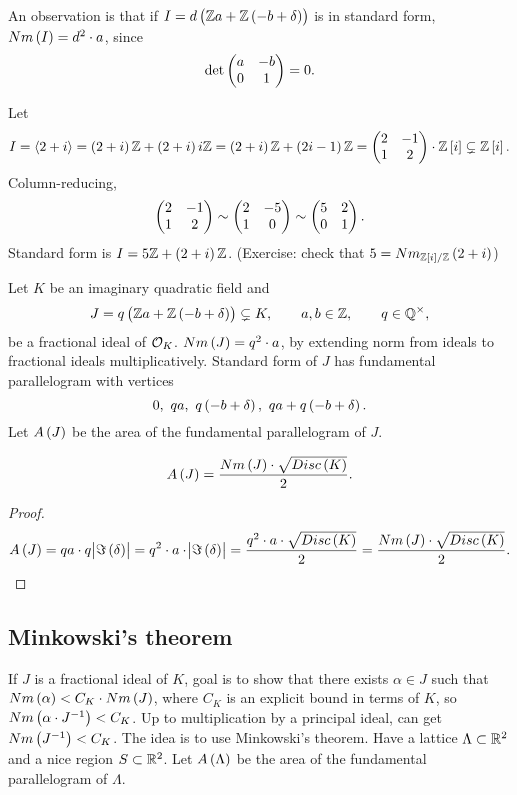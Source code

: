 An observation is that if $ I = d\br{\Z a + \Z\br{-b + \delta}} $ is in standard form, $ Nm\br{I} = d^2 \cdot a $, since
$$ \det\begin{pmatrix} a & -b \\ 0 & 1 \end{pmatrix} = 0. $$

\pagebreak


\begin{example*}
Let
$$ I = \abr{2 + i} = \br{2 + i}\Z + \br{2 + i}i\Z = \br{2 + i}\Z + \br{2i - 1}\Z = \twobytwo{2}{-1}{1}{2} \cdot \Z\sbr{i} \subsetneq \Z\sbr{i}. $$
Column-reducing,
$$ \begin{pmatrix} 2 & -1 \\ 1 & 2 \end{pmatrix} \sim \begin{pmatrix} 2 & -5 \\ 1 & 0 \end{pmatrix} \sim \begin{pmatrix} 5 & 2 \\ 0 & 1 \end{pmatrix}. $$
Standard form is $ I = 5\Z + \br{2 + i}\Z $. (Exercise: check that $ 5 = Nm_{\Z\sbr{i} / \Z}\br{2 + i} $)
\end{example*}

Let $ K $ be an imaginary quadratic field and
$$ J = q\br{\Z a + \Z\br{-b + \delta}} \subsetneq K, \qquad a, b \in \Z, \qquad q \in \Q^\times, $$
be a fractional ideal of $ \mathcal{O}_K $. $ Nm\br{J} = q^2 \cdot a $, by extending norm from ideals to fractional ideals multiplicatively. Standard form of $ J $ has fundamental parallelogram with vertices
$$ 0, \ qa, \ q\br{-b + \delta}, \ qa + q\br{-b + \delta}. $$
Let $ A\br{J} $ be the area of the fundamental parallelogram of $ J $.

\begin{proposition}
$$ A\br{J} = \dfrac{Nm\br{J} \cdot \sqrt{Disc\br{K}}}{2}. $$
\end{proposition}

\begin{proof}
$$ A\br{J} = qa \cdot q\abs{\Im\br{\delta}} = q^2 \cdot a \cdot \abs{\Im\br{\delta}} = \dfrac{q^2 \cdot a \cdot \sqrt{Disc\br{K}}}{2} = \dfrac{Nm\br{J} \cdot \sqrt{Disc\br{K}}}{2}. $$
\end{proof}

\subsection{Minkowski's theorem}

If $ J $ is a fractional ideal of $ K $, goal is to show that there exists $ \alpha \in J $ such that $ Nm\br{\alpha} < C_K \cdot Nm\br{J} $, where $ C_K $ is an explicit bound in terms of $ K $, so $ Nm\br{\alpha \cdot J^{-1}} < C_K $. Up to multiplication by a principal ideal, can get $ Nm\br{J^{-1}} < C_K $. The idea is to use Minkowski's theorem. Have a lattice $ \Lambda \subset \mathbb{R}^2 $ and a nice region $ S \subset \mathbb{R}^2 $. Let $ A\br{\Lambda} $ be the area of the fundamental parallelogram of $ \Lambda $.

